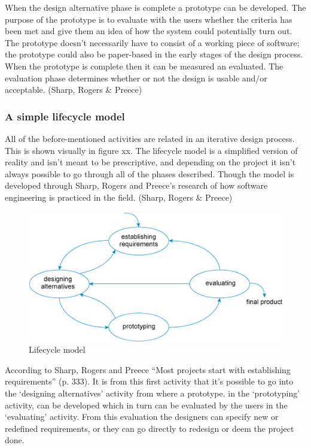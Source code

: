 When the design alternative phase is complete a prototype can be developed. The purpose of the prototype is to evaluate with the users whether the criteria has been met and give them an idea of how the system could potentially turn out. The prototype doesn’t necessarily have to consist of a working piece of software; the prototype could also be paper-based in the early stages of the design process. When the prototype is complete then it can be measured an evaluated. The evaluation phase determines whether or not the design is usable and/or acceptable. (Sharp, Rogers \& Preece)

\subsubsection{A simple lifecycle model}
All of the before-mentioned activities are related in an iterative design process. This is shown visually in figure xx. The lifecycle model is a simplified version of reality and isn’t meant to be prescriptive, and depending on the project it isn’t always possible to go through all of the phases described. Though the model is developed through Sharp, Rogers and Preece’s research of how software engineering is practiced in the field. (Sharp, Rogers \& Preece)

\begin{figure}[h]
	\includegraphics[width=1\textwidth]{billeder/lifecycle.png}
	\caption{Lifecycle model}
\end{figure}

According to Sharp, Rogers and Preece “Most projects start with establishing requirements” (p. 333). It is from this first activity that it’s possible to go into the ‘designing alternatives’ activity from where a prototype. in the ‘prototyping’ activity, can be developed which in turn can be evaluated by the users in the ‘evaluating’ activity. From this evaluation the designers can specify new or redefined requirements, or they can go directly to redesign or deem the project done.

